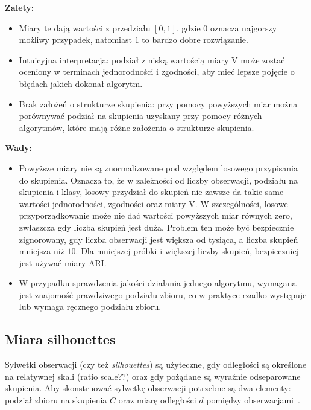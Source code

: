 \documentclass{praca1}
\begin{document}
\textbf{Zalety:}
\begin{itemize}
\item Miary te dają wartości z przedziału $[0, 1]$, gdzie $0$ oznacza najgorszy możliwy przypadek, natomiast $1$ to bardzo dobre rozwiązanie.
\item Intuicyjna interpretacja: podział z niską wartością miary V może zostać oceniony w terminach jednorodności i zgodności, aby mieć lepsze pojęcie o błędach jakich dokonał algorytm.
\item Brak założeń o strukturze skupienia: przy pomocy powyższych miar można porównywać podział na skupienia uzyskany przy pomocy różnych algorytmów, które mają różne założenia o strukturze skupienia.
\end{itemize}


\textbf{Wady:}
\begin{itemize}
\item Powyższe miary nie są znormalizowane pod względem losowego przypisania do skupienia. Oznacza to, że w zależności od liczby obserwacji, podziału na skupienia i klasy, losowy przydział do skupień nie zawsze da takie same wartości jednorodności, zgodności oraz miary V. W szczególności, losowe przyporządkowanie może nie dać wartości powyższych miar równych zero, zwłaszcza gdy liczba skupień jest duża. Problem ten może być bezpiecznie zignorowany, gdy liczba obserwacji jest większa od tysiąca, a liczba skupień mniejsza niż $10$. Dla mniejszej próbki i większej liczby skupień, bezpieczniej jest używać miary ARI.
\item W przypadku sprawdzenia jakości działania jednego algorytmu, wymagana jest znajomość prawdziwego podziału zbioru, co w praktyce rzadko występuje lub wymaga ręcznego podziału zbioru.
\end{itemize}

\subsection{Miara silhouettes}

Sylwetki obserwacji (czy też \emph{silhouettes}) są użyteczne, gdy odległości są określone na relatywnej skali (ratio scale??) oraz gdy pożądane są wyraźnie odseparowane skupienia. Aby skonstruować sylwetkę obserwacji potrzebne są dwa elementy: podział zbioru na skupienia $C$ oraz miarę odległości $d$ pomiędzy obserwacjami~\cite{Rousseeuw1987:silhoutte}.
\end{document}
